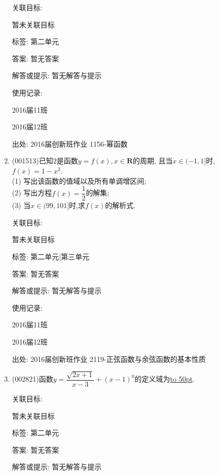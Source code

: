 \documentclass[10pt,a4paper]{article}
\newcommand{\blank}[1]{\underline{\hbox to #1pt{}}}
\begin{document}
\begin{enumerate}[1.]
关联目标:

暂未关联目标



标签: 第二单元

答案: 暂无答案

解答或提示: 暂无解答与提示

使用记录:

2016届11班				

2016届12班				


出处: 2016届创新班作业	1156-幂函数
\item { (001513)}已知$2$是函数$y=f(x),x\in\mathbf{R}$的周期, 且当$x\in(-1,1]$时, $f(x)=1-x^2$.\\ 
(1) 写出该函数的值域以及所有单调增区间;\\ 
(2) 写出方程$f(x)=\dfrac{1}{2}$的解集;\\ 
(3) 当$x\in(99,101]$时,求$f(x)$的解析式.


关联目标:

暂未关联目标



标签: 第二单元|第三单元

答案: 暂无答案

解答或提示: 暂无解答与提示

使用记录:

2016届11班			

2016届12班			


出处: 2016届创新班作业	2119-正弦函数与余弦函数的基本性质
\item { (002821)}函数$y=\dfrac{\sqrt{2x+1}}{x-3}+(x-1)^0$的定义域为\blank{50}.


关联目标:

暂未关联目标



标签: 第二单元

答案: 暂无答案

解答或提示: 暂无解答与提示


\end{enumerate}
\end{document}
